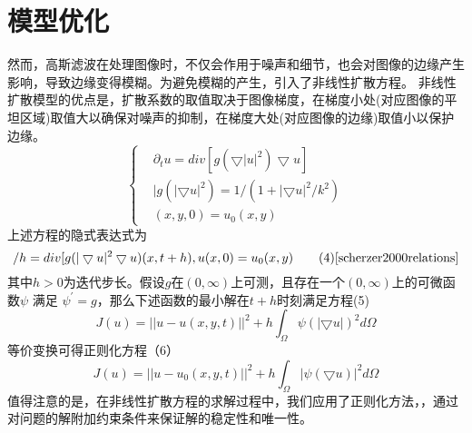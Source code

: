 \section{模型优化}
然而，高斯滤波在处理图像时，不仅会作用于噪声和细节，也会对图像的边缘产生影响，导致边缘变得模糊。为避免模糊的产生，引入了非线性扩散方程。
非线性扩散模型的优点是，扩散系数的取值取决于图像梯度，在梯度小处(对应图像的平坦区域)取值大以确保对噪声的抑制，在梯度大处(对应图像的边缘)取值小以保护边缘。\cite{56205}
\begin{equation}
\left\{
\begin{aligned}
& \partial_{t}u=div[g(\bigtriangledown |u|^{2})\bigtriangledown u] \\ 
& |g(|\bigtriangledown u|^{2})=1/(1+|\bigtriangledown u|^{2}/k^{2}) \\
& (x, y, 0)=u_{0}(x, y)
\end{aligned}
\right.
\tag{3}
\end{equation}
上述方程的隐式表达式为
\begin{equation}
    [u(x, t+h)-u(x, t)]/h=div[g(|\bigtriangledown u|^{2}\bigtriangledown u)(x, t+h), \space u(x, 0)=u_{0}(x, y)
    \tag{4}
    \cite{scherzer2000relations}
\end{equation}
其中$h>0$为迭代步长。假设$g$在$(0,\infty)$上可测，且存在一个$(0,\infty)$上的可微函数$\psi$ 满足 $\psi^{\prime}=g$，那么下述函数的最小解在$t+h$时刻满足方程(5)
\begin{equation}
    J(u)=||u-u(x,y,t)||^{2}+h\int _{\Omega}\psi (|\bigtriangledown u|)^{2}d\Omega
    \tag{5}
\end{equation}
等价变换可得正则化方程（6）
\begin{equation}
     J(u) = ||u - u_{0}(x, y, t)||^{2} + h \int_{\Omega} |\psi(
\bigtriangledown u)|^{2} d\Omega
\tag{6}
\end{equation}
值得注意的是，在非线性扩散方程的求解过程中，我们应用了正则化方法，，通过对问题的解附加约束条件来保证解的稳定性和唯一性。
